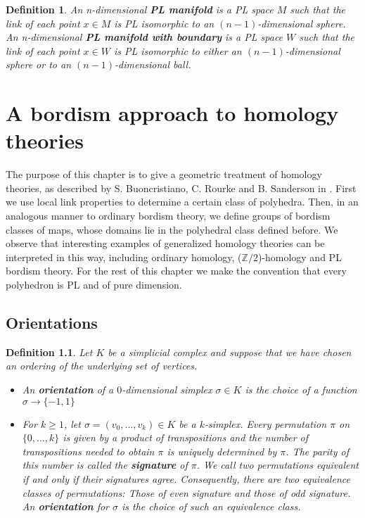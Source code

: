 \documentclass{scrreprt}
\newtheorem{definition}[prop]{Definition}
\begin{document}
\begin{definition}
An n-dimensional \textbf{PL manifold} is a PL space $M$ such that the link of each point $x \in M$ is PL isomorphic to an $(n-1)$-dimensional sphere. An n-dimensional \textbf{PL manifold with boundary} is a PL space $W$ such that the link of each point $x \in W$ is PL isomorphic to either an $(n-1)$-dimensional sphere or to an $(n-1)$-dimensional ball.
\end{definition}



\chapter{A bordism approach to homology theories}\label{bordismhomology}
The purpose of this chapter is to give a geometric treatment of homology theories, as described by S. Buoncristiano, C. Rourke and B. Sanderson in \cite{BRS}. First we use local link properties to determine a certain class of polyhedra. Then, in an analogous manner to ordinary bordism theory, we define groups of bordism classes of maps, whose domains lie in the polyhedral class defined before. We observe that interesting examples of generalized homology theories can be interpreted in this way, including ordinary homology, ($\mathbb{Z}/2$)-homology and PL bordism theory. \newline
For the rest of this chapter we make the convention that every polyhedron is PL and of pure dimension.

\section{Orientations}

\begin{definition}Let $K$ be a simplicial complex and suppose that we have chosen an ordering of the underlying set of vertices.
\begin{itemize}
\item An \textbf{orientation} of a $0$-dimensional simplex $\sigma \in K$ is the choice of a function $\sigma \to \{ -1,1 \}$
\item For $k \geq 1$, let $\sigma = (v_0,...,v_k) \in K$ be a $k$-simplex. Every permutation $\pi$ on $\{ 0,...,k \}$ is given by a product of transpositions and the number of transpositions needed to obtain $\pi$ is uniquely determined by $\pi$. The parity of this number is called the \textbf{signature} of $\pi$. We call two permutations equivalent if and only if their signatures agree. Consequently, there are two equivalence classes of permutations: Those of even signature and those of odd signature. An \textbf{orientation} for $\sigma$ is the choice of such an equivalence class.
\end{itemize}
\end{definition}
\end{document}

